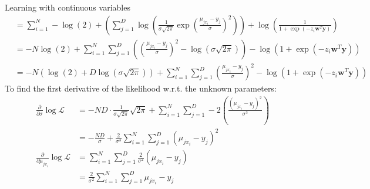 \documentclass{ml}
\begin{document}
\begin{question}{Learning with continuous variables}
\begin{align*}
            &= \sum\limits_{i=1}^N -\log(2) + \left(
                \sum\limits_{j=1}^D \log \left( 
                \frac{1}{\sigma\sqrt{2\pi}} 
                \exp{\left(\frac{\mu_{j{x_i}}-y_j}{\sigma}\right)^2}
                \right) \right) +
                \log \left( \frac{1}{1+\exp \left(-z_i \textbf{w}^T
                \textbf{y}\right)} \right) \\
            &= -N\log(2) + \sum\limits_{i=1}^N \sum \limits_{j=1}^D
                \left( \left( \frac{\mu_{j{x_i}}-y_j}{\sigma}\right)^2 -
                \log (\sigma\sqrt{2\pi})\right) - 
                \log(1+\exp(-z_i\textbf{w}^T\textbf{y})) \\
            &= -N(\log(2) + D\log(\sigma\sqrt{2\pi})) +
                \sum\limits_{i=1}^N \sum\limits_{j=1}^D \left(
                \frac{\mu_{jx_i}-y_j}{\sigma} \right)^2 - \log
                (1+\exp(-z_i\textbf{w}^T\textbf{y}))
        \end{align*}
        To find the first derivative of the likelihood w.r.t. the
        unknown parameters:
        \begin{align*}
            \frac{\partial}{\partial\sigma}\log \mathcal{L}
            &= -ND\cdot \frac{1}{\sigma\sqrt{2\pi}} \sqrt{2\pi} +
                \sum\limits_{i=1}^N \sum\limits_{j=1}^D -2 \left(
                \frac{(\mu_{jx_i}-y_j)^2}{\sigma^3} \right) \\
            &= -\frac{ND}{\sigma} + \frac{2}{\sigma^3} 
                \sum\limits_{i=1}^N \sum\limits_{j=1}^D
                (\mu_{jx_i}-y_j)^2 \\
            \frac{\partial}{\partial\mu_{jx_i}} \log \mathcal{L}
            &= \sum\limits_{i=1}^N \sum\limits_{j=1}^D
                \frac{2}{\sigma^2} (\mu_{jx_i}-y_j) \\
            &= \frac{2}{\sigma^2} \sum\limits_{i=1}^N
                \sum\limits_{j=1}^D \mu_{jx_i}-y_j
        \end{align*}
\end{question} %
\end{document}
